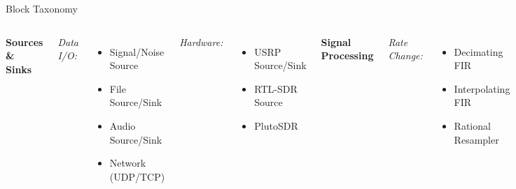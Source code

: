 \documentclass[aspectratio=169,11pt]{beamer}
\begin{document}
\begin{frame}{Block Taxonomy}
\footnotesize
\begin{columns}[T]
\textbf{\color{blue}Sources \& Sinks}

\textit{Data I/O:}
\begin{itemize}
\setlength\itemsep{0em}
    \item Signal/Noise Source
    \item File Source/Sink
    \item Audio Source/Sink
    \item Network (UDP/TCP)
\end{itemize}

\textit{Hardware:}
\begin{itemize}
\setlength\itemsep{0em}
    \item USRP Source/Sink
    \item RTL-SDR Source
    \item PlutoSDR
\end{itemize}

\textbf{\color{blue}Signal Processing}

\textit{Rate Change:}
\begin{itemize}
\setlength\itemsep{0em}
    \item Decimating FIR
    \item Interpolating FIR
    \item Rational Resampler
\end{itemize}

\textit{Transforms:}
\begin{itemize}
\setlength\itemsep{0em}
    \item FFT/IFFT
\end{itemize}
\begin{itemize}
\setlength\itemsep{0em}
    \item Add/Multiply
    \item Mag/Phase
\end{itemize}

\textbf{\color{blue}Modulation}

\textit{Modulators:}
\begin{itemize}
\setlength\itemsep{0em}
    \item AM/FM/PM
    \item PSK/QAM
    \item OFDM/GFSK
\end{itemize}

\textit{Synchronization:}
\begin{itemize}
\setlength\itemsep{0em}
    \item Costas Loop
    \item Clock Recovery
    \item AGC
\end{itemize}


\end{columns}
\end{frame}
\end{document}
